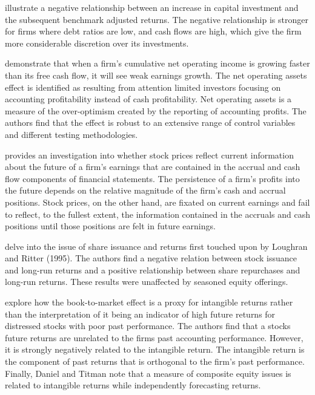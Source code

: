 \documentclass[12pt, a4paper, oneside]{article}
\begin{document}
 illustrate a negative relationship between an increase in capital investment and the subsequent benchmark adjusted returns. The negative relationship is stronger for firms where debt ratios are low, and cash flows are high, which give the firm more considerable discretion over its investments.

 demonstrate that when a firm’s cumulative net operating income is growing faster than its free cash flow, it will see weak earnings growth. The net operating assets effect is identified as resulting from attention limited investors focusing on accounting profitability instead of cash profitability. Net operating assets is a measure of the over-optimism created by the reporting of accounting profits. The authors find that the effect is robust to an extensive range of control variables and different testing methodologies. 

 provides an investigation into whether stock prices reflect current information about the future of a firm’s earnings that are contained in the accrual and cash flow components of financial statements. The persistence of a firm’s profits into the future depends on the relative magnitude of the firm's cash and accrual positions. Stock prices, on the other hand, are fixated on current earnings and fail to reflect, to the fullest extent, the information contained in the accruals and cash positions until those positions are felt in future earnings. 

 delve into the issue of share issuance and returns first touched upon by Loughran and Ritter (1995). The authors find a negative relation between stock issuance and long-run returns and a positive relationship between share repurchases and long-run returns. These results were unaffected by seasoned equity offerings. 

 explore how the book-to-market effect is a proxy for intangible returns rather than the interpretation of it being an indicator of high future returns for distressed stocks with poor past performance. The authors find that a stocks future returns are unrelated to the firms past accounting performance. However, it is strongly negatively related to the intangible return. The intangible return is the component of past returns that is orthogonal to the firm’s past performance. Finally, Daniel and Titman note that a measure of composite equity issues is related to intangible returns while independently forecasting returns. 
\end{document}
